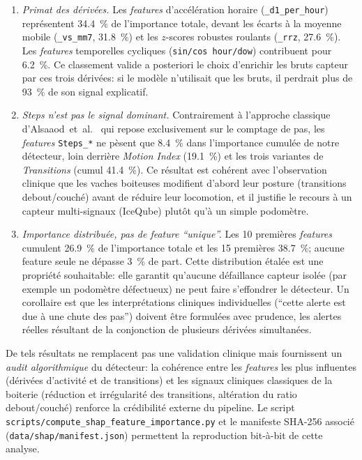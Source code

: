 \begin{enumerate}
    \item \textit{Primat des dérivées.} Les \textit{features} d'accélération
    horaire (\texttt{\_d1\_per\_hour}) représentent 34.4~\% de
    l'importance totale, devant les écarts à la moyenne mobile
    (\texttt{\_vs\_mm7}, 31.8~\%) et les $z$-scores robustes
    roulants (\texttt{\_rrz}, 27.6~\%). Les \textit{features} temporelles
    cycliques (\texttt{sin/cos hour/dow}) contribuent pour 6.2~\%.
    Ce classement valide a posteriori le choix d'enrichir les bruts
    capteur par ces trois dérivées: si le modèle n'utilisait que les
    bruts, il perdrait plus de 93~\% de son signal explicatif.

    \item \textit{Steps n'est pas le signal dominant.} Contrairement
    à l'approche classique d'Alsaaod~et~al.~\citep{alsaaod2012electronic}
    qui repose exclusivement sur le comptage de pas, les \textit{features}
    \texttt{Steps\_*} ne pèsent que 8.4~\% dans l'importance
    cumulée de notre détecteur, loin derrière \emph{Motion Index}
    (19.1~\%) et les trois variantes de \emph{Transitions} (cumul
    41.4~\%). Ce résultat est cohérent avec l'observation clinique
    que les vaches boiteuses modifient d'abord leur posture
    (transitions debout/couché) avant de réduire leur locomotion,
    et il justifie le recours à un capteur multi-signaux (IceQube)
    plutôt qu'à un simple podomètre.

    \item \textit{Importance distribuée, pas de feature ``unique''.}
    Les 10 premières \textit{features} cumulent 26.9~\% de l'importance totale
    et les 15 premières 38.7~\%; aucune feature seule ne dépasse
    3~\% de part. Cette distribution étalée est une propriété
    souhaitable: elle garantit qu'aucune défaillance capteur isolée
    (par exemple un podomètre défectueux) ne peut faire s'effondrer
    le détecteur. Un corollaire est que les interprétations
    cliniques individuelles (``cette alerte est due à une chute
    des pas'') doivent être formulées avec prudence, les alertes
    réelles résultant de la conjonction de plusieurs dérivées
    simultanées.
\end{enumerate}

De tels résultats ne remplacent pas une validation clinique mais fournissent
un \emph{audit algorithmique} du détecteur: la cohérence entre les
\textit{features} les plus influentes (dérivées d'activité et de transitions) et
les signaux cliniques classiques de la boiterie (réduction et
irrégularité des transitions, altération du ratio debout/couché)
renforce la crédibilité externe du pipeline. Le script
\texttt{scripts/\allowbreak compute\_\allowbreak shap\_\allowbreak feature\_\allowbreak importance.py}
et le manifeste
SHA-256 associé (\texttt{data/shap/manifest.json}) permettent la
reproduction bit-à-bit de cette analyse.

